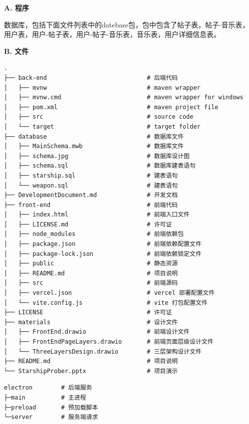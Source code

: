\documentclass{base}
\numberwithin{figure}{section} %
\begin{document}
\textbf{A. 程序}


数据库，包括下面文件列表中的datebase包，包中包含了帖子表，帖子-音乐表，用户表，用户-帖子表，用户-帖子-音乐表，音乐表，用户详细信息表。

\textbf{B. 文件}

\begin{verbatim}
.
├── back-end                            # 后端代码
│   ├── mvnw                            # maven wrapper
│   ├── mvnw.cmd                        # maven wrapper for windows
│   ├── pom.xml                         # maven project file
│   ├── src                             # source code
│   └── target                          # target folder
├── database                            # 数据库文件
│   ├── MainSchema.mwb                  # 数据库文件
│   ├── schema.jpg                      # 数据库设计图
│   ├── schema.sql                      # 数据库建表语句
│   ├── starship.sql                    # 建表语句
│   └── weapon.sql                      # 建表语句
├── DevelopmentDocument.md              # 开发文档
├── front-end                           # 前端代码
│   ├── index.html                      # 前端入口文件
│   ├── LICENSE.md                      # 许可证
│   ├── node_modules                    # 前端依赖包
│   ├── package.json                    # 前端依赖配置文件
│   ├── package-lock.json               # 前端依赖锁定文件
│   ├── public                          # 静态资源
│   ├── README.md                       # 项目说明
│   ├── src                             # 前端源码
│   ├── vercel.json                     # vercel 部署配置文件
│   └── vite.config.js                  # vite 打包配置文件
├── LICENSE                             # 许可证
├── materials                           # 设计文件
│   ├── FrontEnd.drawio                 # 前端设计文件
│   ├── FrontEndPageLayers.drawio       # 前端页面层级设计文件
│   └── ThreeLayersDesign.drawio        # 三层架构设计文件
├── README.md                           # 项目说明
└── StarshipProber.pptx                 # 项目演示
\end{verbatim}

\begin{verbatim}
electron        # 后端服务
├─main          # 主进程
├─preload       # 预加载脚本
└─server        # 服务端请求
\end{verbatim}
\end{document}
